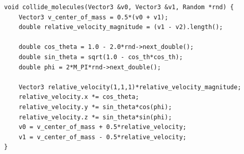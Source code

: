 \begin{lstlisting}[caption=Determining post-collision velocities., label=lst:post_collisions_velocities]
void collide_molecules(Vector3 &v0, Vector3 &v1, Random *rnd) {
    Vector3 v_center_of_mass = 0.5*(v0 + v1);
    double relative_velocity_magnitude = (v1 - v2).length();
    
    double cos_theta = 1.0 - 2.0*rnd->next_double();
    double sin_theta = sqrt(1.0 - cos_th*cos_th);
    double phi = 2*M_PI*rnd->next_double();

    Vector3 relative_velocity(1,1,1)*relative_velocity_magnitude;
    relative_velocity.x *= cos_theta;
    relative_velocity.y *= sin_theta*cos(phi);
    relative_velocity.z *= sin_theta*sin(phi);
    v0 = v_center_of_mass + 0.5*relative_velocity;
    v1 = v_center_of_mass - 0.5*relative_velocity;
}
\end{lstlisting}
